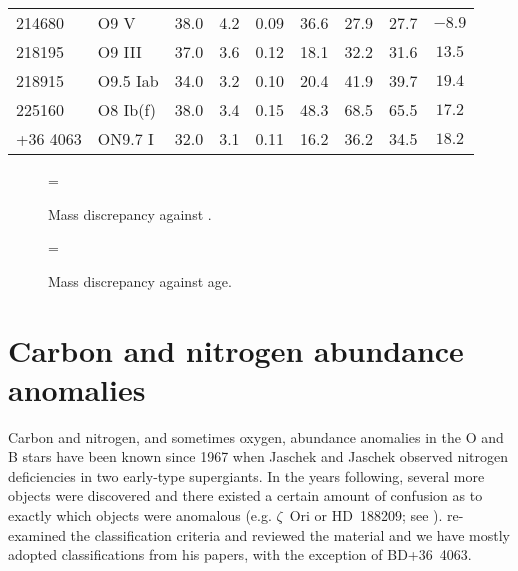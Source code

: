\begin{table}
\begin{center}
\begin{tabular}{llccccccc}
  214680 &          O9 V & 38.0 &  4.2 & 0.09 &36.6 & 27.9 & 27.7 & $-8.9$\\
  218195 &        O9 III & 37.0 &  3.6 & 0.12 &18.1 & 32.2 & 31.6 & $13.5$\\
  218915 &      O9.5 Iab & 34.0 &  3.2 & 0.10 &20.4 & 41.9 & 39.7 & $19.4$\\
  225160 &      O8 Ib(f) & 38.0 &  3.4 & 0.15 &48.3 & 68.5 & 65.5 & $17.2$\\
+36 4063 &       ON9.7 I & 32.0 &  3.1 & 0.11 &16.2 & 36.2 & 34.5 & $18.2$\\
\hline\hline
\end{tabular}
\label{ta:ostars:mass_disc}
\end{center}
\end{table} %

\begin{figure} %
\epsfxsize=\figwidth
\setlength{\cen}{(\textwidth / 2) - (\epsfxsize / 2)}
\hspace{\cen}
\caption[Mass discrepancy against \logg]
{\fcfont Mass discrepancy against \logg.}
\label{fig:dm:logg}
\end{figure}   %

\begin{figure} %
\epsfxsize=\figwidth
\setlength{\cen}{(\textwidth / 2) - (\epsfxsize / 2)}
\hspace{\cen}
\caption[Mass discrepancy against age]
{\fcfont Mass discrepancy against age.}
\label{fig:dm:age}
\end{figure}   %


\section{Carbon and nitrogen abundance anomalies}
\label{sec:cno_anomalies}

Carbon and nitrogen, and sometimes oxygen, abundance anomalies in the
O and B stars have been known since 1967 when Jaschek and Jaschek
observed nitrogen deficiencies in two early-type supergiants. In the years
following, several more objects were discovered and there existed a
certain amount of confusion as to exactly which objects were anomalous
(e.g. $\zeta$~Ori or HD~188209; see \cite{jaja:74}). 
re-examined the classification criteria and reviewed the material and
we have mostly adopted classifications from his papers, with the
exception of BD+36~4063.

